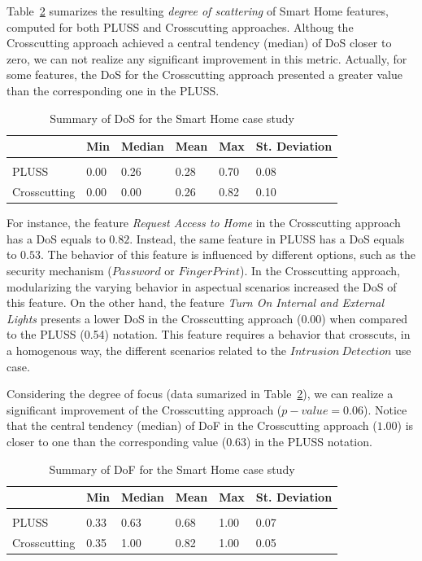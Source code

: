 \documentclass{acm_proc_article-sp}
\begin{document}
Table~\ref{tab:sh-dof} sumarizes the resulting \emph{degree of scattering} of
Smart Home features, computed for both PLUSS and Crosscutting approaches. Althoug the
Crosscutting approach achieved a central tendency (median) of DoS closer to
zero, we can not realize any significant improvement in this metric. Actually, for some
features, the DoS for the Crosscutting approach presented a greater value than
the corresponding one in the PLUSS. 

\begin{table}[htb]
\centering
\caption{Summary of DoS for the Smart Home case study}
\label{tab:sh-dos}
\begin{small}
\begin{tabular}{llllll} \hline
					& Min 	& Median 	& Mean 	& Max 	& St. Deviation \\ \hline \\
	PLUSS			& 0.00  & 0.26   	& 0.28  & 0.70 	& 0.08 			\\
	Crosscutting	& 0.00  & 0.00  	& 0.26 	& 0.82 & 0.10  		\\ \hline	
\end{tabular}
\end{small}
\end{table}

For instance, the feature \emph{Request Access to Home} in the Crosscutting
approach has a DoS equals to $0.82$. Instead, the same feature in PLUSS has a
DoS equals to $0.53$. The behavior of this feature is influenced by different
options, such as the security mechanism ($Password$ or $Finger Print$).
In the Crosscutting approach, modularizing the varying behavior in 
aspectual scenarios increased the DoS of this feature. 
On the other hand, the feature \emph{Turn On Internal and External Lights}
presents a lower DoS in the Crosscutting approach (0.00) when compared to the
PLUSS (0.54) notation. This feature requires a behavior that crosscuts, in a
homogenous way, the different scenarios related to the $Intrusion\ Detection$
use case. 

Considering the degree of focus (data sumarized in Table~\ref{tab:sh-dof}), we
can realize a significant improvement of the Crosscutting approach
($p-value=0.06$). Notice that the central tendency (median) of DoF in the
Crosscutting approach ($1.00$) is closer to one than the corresponding value
($0.63$) in the PLUSS notation.
  
\begin{table}[htb] \centering
\caption{Summary of DoF for the Smart Home case study}
\label{tab:sh-dof}
\begin{small}
\begin{tabular}{llllll} \hline
					& Min 	& Median 	& Mean 	& Max 	& St. Deviation \\ \hline \\
	PLUSS			& 0.33  & 0.63   	& 0.68  & 1.00 	& 0.07 			\\
	Crosscutting	& 0.35  & 1.00   	& 0.82 	& 1.00 	& 0.05			\\ \hline	
\end{tabular}
\end{small}
\end{table}
\end{document}
